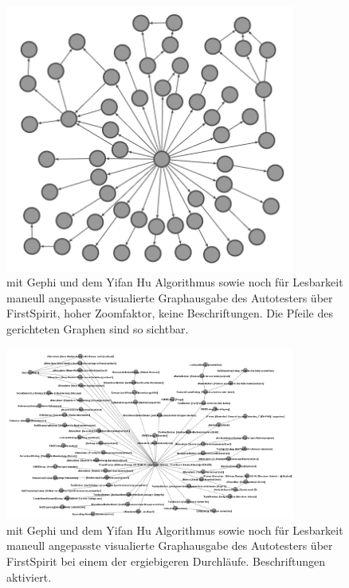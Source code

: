 \begin{figure}
	\centering
	\includegraphics[width=0.85\textwidth]{bilder/model_firstspirit_notext.png}
	\caption{mit Gephi \cite{website:gephi} und dem Yifan Hu Algorithmus \cite{hu2005efficient}
    sowie noch für Lesbarkeit maneull angepasste visualierte Graphausgabe 
	des Autotesters über FirstSpirit, hoher Zoomfaktor, keine Beschriftungen.
	Die Pfeile des gerichteten Graphen sind so sichtbar.}
	\label{fig:model_firstspirit_notext}
\end{figure}

\begin{figure}
	\centering
	\includegraphics[angle=90,width=0.85\textwidth]{bilder/model_freespirit.png}
	\caption{mit Gephi \cite{website:gephi} und dem Yifan Hu Algorithmus \cite{hu2005efficient}
    sowie noch für Lesbarkeit maneull angepasste visualierte Graphausgabe 
	des Autotesters über FirstSpirit bei einem der ergiebigeren Durchläufe.
	Beschriftungen aktiviert.}
	\label{fig:model_freespirit_06.10.2015}
\end{figure}



